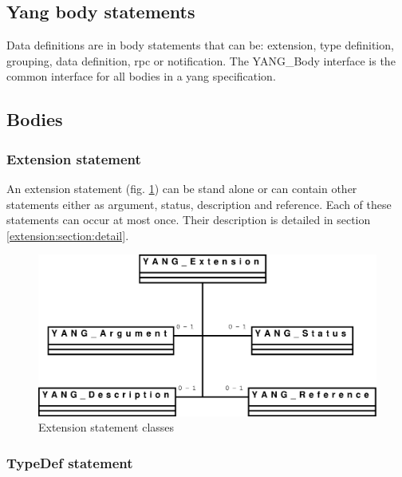 \documentclass[a4paper]{article}
\begin{document}
\subsection{Yang body statements}

Data definitions are  in body statements that can  be: extension, type
definition,  grouping,  data  definition,  rpc or  notification.   The
YANG\_Body interface is the common  interface for all bodies in a yang
specification.

\subsection{Bodies}

\subsubsection{Extension statement}
\label{extension:section:global}

An extension  statement (fig.  \ref{extension}) can be  stand alone or
can contain  other statements either as  argument, status, description
and  reference.  Each  of these  statements  can occur  at most  once.
Their       description       is       detailed       in       section
\ref{extension:section:detail}.

\begin{figure}[htbp]
\begin{center}
\includegraphics[scale = .3]{extension.eps}
\end{center}
\caption{Extension statement classes}
\label{extension}
\end{figure}

\subsubsection{TypeDef statement}
\label{typedef:section:global}
\end{document}
